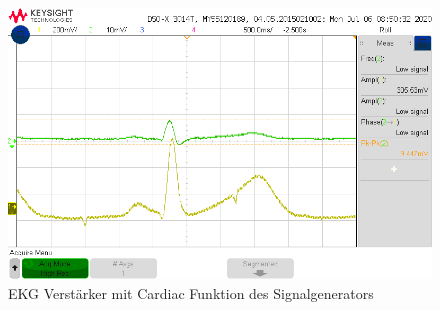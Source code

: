 \begin{figure}[h]
    \centering
    \includegraphics[width = \costumPicWidth]{Lab_4/Messungen/ekg.waveform.png}
    \caption{EKG Verstärker mit Cardiac Funktion des Signalgenerators}
    \label{fig:my_label}
\end{figure}